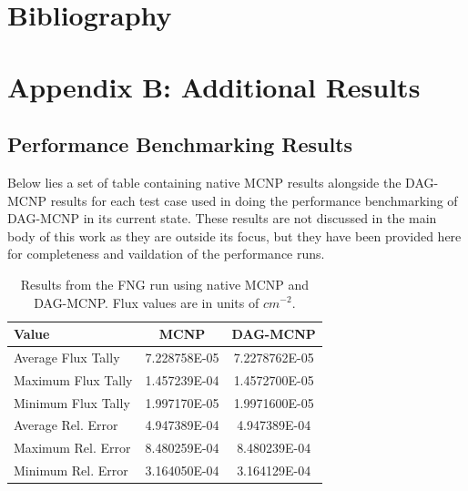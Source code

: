 \documentclass[12pt, a4paper]{article}
\begin{document}
\section{Bibliography}





\section{Appendix B: Additional Results}%

\subsection{Performance Benchmarking Results}%

Below lies a set of table containing native MCNP results alongside the DAG-MCNP results for each test case used in doing the performance benchmarking of DAG-MCNP in its current state. These results are not discussed in the main body of this work as they are outside its focus, but they have been provided here for completeness and vaildation of the performance runs.

\begin{table}[H]
  \caption{Results from the FNG run using native MCNP and DAG-MCNP. Flux values are in units of  $cm^{-2}$.}
  \label{fng_perf_results}
  \centering
  \begin{tabular}{l c c}
    \toprule
    Value & MCNP & DAG-MCNP \\
    \hline
    Average Flux Tally & 7.228758E-05 & 7.2278762E-05 \\
    \hline
    Maximum Flux Tally & 1.457239E-04 & 1.4572700E-05 \\
    \hline
    Minimum Flux Tally & 1.997170E-05 & 1.9971600E-05 \\
    \hline
    Average Rel. Error & 4.947389E-04 & 4.947389E-04 \\
    \hline
    Maximum Rel. Error & 8.480259E-04 & 8.480239E-04 \\
    \hline
    Minimum Rel. Error & 3.164050E-04 & 3.164129E-04 \\
    \bottomrule
  \end{tabular}  
\end{table}
\end{document}
